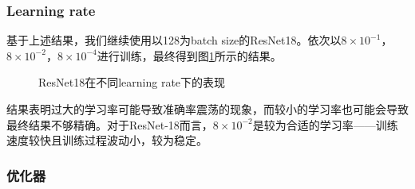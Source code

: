 \documentclass[hyperref, UTF8, 12pt]{article}
\theoremstyle{definition}
\begin{document}
\subsubsection{Learning rate}
基于上述结果，我们继续使用以128为batch size的ResNet18。依次以$8\times10^{-1}$，$8\times10^{-2}$，$8\times10^{-4}$进行训练，最终得到图\ref{fig:resnet18_lr}所示的结果。
\begin{figure}[H]
	\centering
	\caption{ResNet18在不同learning rate下的表现}
	\label{fig:resnet18_lr}
\end{figure}
结果表明过大的学习率可能导致准确率震荡的现象，而较小的学习率也可能会导致最终结果不够精确。对于ResNet-18而言，$8\times10^{-2}$是较为合适的学习率——训练速度较快且训练过程波动小，较为稳定。
\subsubsection{优化器}
\end{document}
